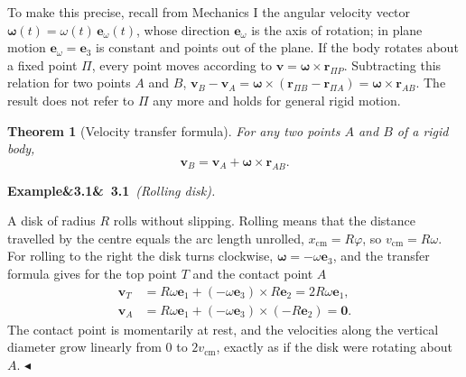 \documentclass[11pt,a4paper,oneside]{report}
\numberwithin{equation}{chapter}
\newcommand{\vect}[1]{\bm{#1}}
\newcommand{\e}[1]{\vect{e}_{#1}}
\newcommand{\cm}{\mathrm{cm}}
\theoremstyle{plain}
\newtheorem{theorem}{Theorem}[chapter]
\theoremstyle{definition}
\theoremstyle{remark}
\newenvironment{example}[2]{%
  \par\addvspace{\bigskipamount}\noindent
  \textbf{Example\ifx&#1&\else~#1\fi}\ \textit{(#2).}\ \ignorespaces}%
  {\hfill$\blacktriangleleft$\par\addvspace{\bigskipamount}}
\begin{document}
To make this precise, recall from Mechanics I the angular velocity vector $\vect\omega(t)=\omega(t)\,\e\omega(t)$,
whose direction $\e\omega$ is the axis of rotation; in plane motion $\e\omega=\e3$ is constant and points out of the
plane. If the body rotates about a fixed point $\Pi$, every point moves according to $\vect v=\vect\omega\times\vect r_{\Pi P}$.
Subtracting this relation for two points $A$ and $B$, $\vect v_B-\vect v_A=\vect\omega\times(\vect r_{\Pi B}-\vect r_{\Pi A})=\vect\omega\times\vect r_{AB}$.
The result does not refer to $\Pi$ any more and holds for general rigid motion.

\begin{theorem}[Velocity transfer formula]
For any two points $A$ and $B$ of a rigid body,
\begin{equation}\label{eq:vtransfer}
  \vect v_B=\vect v_A+\vect\omega\times\vect r_{AB}.
\end{equation}
\end{theorem}

\begin{example}{3.1}{Rolling disk}
\begin{center}
\end{center}
A disk of radius $R$ rolls without slipping. Rolling means that the distance travelled by the centre equals the
arc length unrolled, $x_\cm=R\varphi$, so $v_\cm=R\omega$. For rolling to the right the disk turns clockwise,
$\vect\omega=-\omega\e3$, and the transfer formula gives for the top point $T$ and the contact point $A$
\begin{align*}
  \vect v_T&=R\omega\e1+(-\omega\e3)\times R\e2=2R\omega\e1,\\
  \vect v_A&=R\omega\e1+(-\omega\e3)\times(-R\e2)=\vect 0 .
\end{align*}
The contact point is momentarily at rest, and the velocities along the vertical diameter grow linearly from $0$ to
$2v_\cm$, exactly as if the disk were rotating about $A$.
\end{example}
\end{document}
